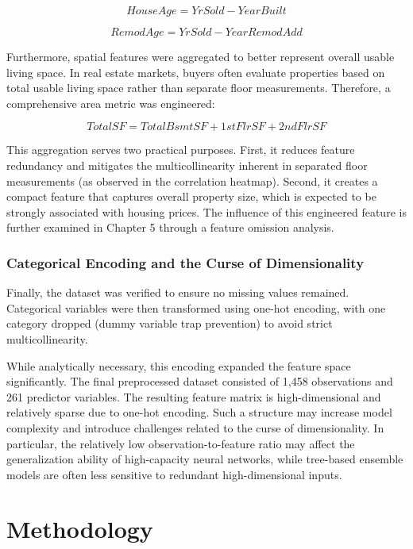 \documentclass[12pt,a4paper,oneside,openany]{book}
\begin{document}
\begin{equation}
HouseAge = YrSold - YearBuilt
\end{equation}

\begin{equation}
RemodAge = YrSold - YearRemodAdd
\end{equation}

Furthermore, spatial features were aggregated to better represent overall usable living space. In real estate markets, buyers often evaluate properties based on total usable living space rather than separate floor measurements. Therefore, a comprehensive area metric was engineered:

\begin{equation}
TotalSF = TotalBsmtSF + 1stFlrSF + 2ndFlrSF
\end{equation}

This aggregation serves two practical purposes. First, it reduces feature redundancy and mitigates the multicollinearity inherent in separated floor measurements (as observed in the correlation heatmap). Second, it creates a compact feature that captures overall property size, which is expected to be strongly associated with housing prices. The influence of this engineered feature is further examined in Chapter 5 through a feature omission analysis.

\subsection{Categorical Encoding and the Curse of Dimensionality}
Finally, the dataset was verified to ensure no missing values remained. Categorical variables were then transformed using one-hot encoding, with one category dropped (dummy variable trap prevention) to avoid strict multicollinearity. 

While analytically necessary, this encoding expanded the feature space significantly. The final preprocessed dataset consisted of 1,458 observations and 261 predictor variables. The resulting feature matrix is high-dimensional and relatively sparse due to one-hot encoding. Such a structure may increase model complexity and introduce challenges related to the curse of dimensionality. In particular, the relatively low observation-to-feature ratio may affect the generalization ability of high-capacity neural networks, while tree-based ensemble models are often less sensitive to redundant high-dimensional inputs.


\chapter{Methodology}
\end{document}
